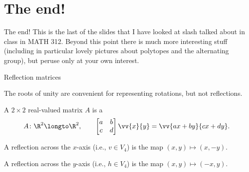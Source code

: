 \documentclass[8pt, handout]{beamer}
\newcommand{\Pause}{}
\begin{document}
\section{The end!}

\begin{frame}{The end!}
  This is the last of the slides that I have looked at slash talked about in class in MATH 312. Beyond this point there is much more interesting stuff (including in particular lovely pictures about polytopes and the alternating group), but peruse only at your own interest.
\end{frame}


\begin{frame}{Reflection matrices} 
  
  The roots of unity are convenient for representing rotations, but not 
  reflections. \medskip\Pause
  
  A $2\times 2$ real-valued matrix $A$ is a 
  \[
  A\colon\R^2\longto\R^2,\qquad \begin{bmatrix}a & b \\ c & d\end{bmatrix}
    \vv{x}{y}=\vv{ax+by}{cx+dy}.
  \]
    
  \Pause
  
  A reflection across the $x$-axis (i.e., $v\in V_4$) is the map
  $(x,y)\mapsto(x,-y)$. \medskip\Pause
  
  A reflection across the $y$-axis (i.e., $h\in V_4$) is the map
  $(x,y)\mapsto(-x,y)$. \medskip\Pause
  

\end{frame}
\end{document}
